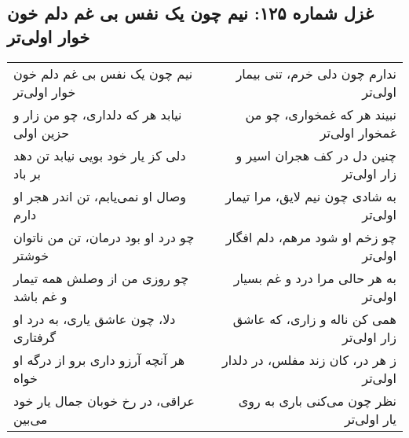 \begin{center}
\section*{غزل شماره ۱۲۵: نیم چون یک نفس بی غم دلم خون خوار اولی‌تر}
\label{sec:125}
\begin{longtable}{l p{0.5cm} r}
نیم چون یک نفس بی غم دلم خون خوار اولی‌تر
&&
ندارم چون دلی خرم، تنی بیمار اولی‌تر
\\
نیابد هر که دلداری، چو من زار و حزین اولی
&&
نبیند هر که غمخواری، چو من غمخوار اولی‌تر
\\
دلی کز یار خود بویی نیابد تن دهد بر باد
&&
چنین دل در کف هجران اسیر و زار اولی‌تر
\\
وصال او نمی‌یابم، تن اندر هجر او دارم
&&
به شادی چون نیم لایق، مرا تیمار اولی‌تر
\\
چو درد او بود درمان، تن من ناتوان خوشتر
&&
چو زخم او شود مرهم، دلم افگار اولی‌تر
\\
چو روزی من از وصلش همه تیمار و غم باشد
&&
به هر حالی مرا درد و غم بسیار اولی‌تر
\\
دلا، چون عاشق یاری، به درد او گرفتاری
&&
همی کن ناله و زاری، که عاشق زار اولی‌تر
\\
هر آنچه آرزو داری برو از درگه او خواه
&&
ز هر در، کان زند مفلس، در دلدار اولی‌تر
\\
عراقی، در رخ خوبان جمال یار خود می‌بین
&&
نظر چون می‌کنی باری به روی یار اولی‌تر
\\
\end{longtable}
\end{center}
